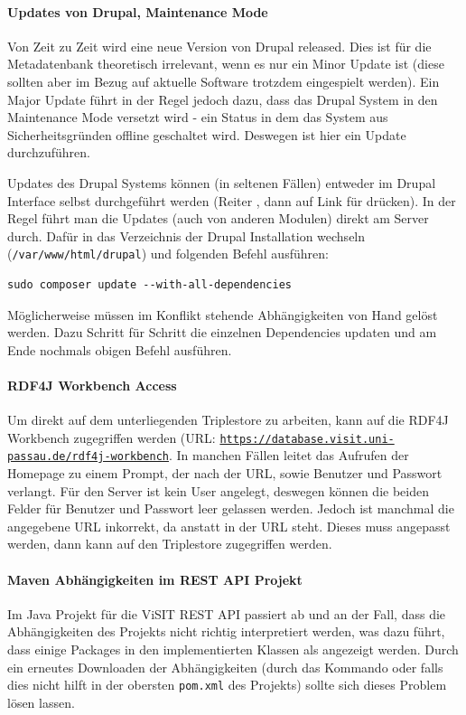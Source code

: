 \paragraph{Updates von Drupal, Maintenance Mode}

Von Zeit zu Zeit wird eine neue Version von Drupal released. Dies ist für die Metadatenbank theoretisch irrelevant, wenn es nur ein Minor Update ist (diese sollten aber im Bezug auf aktuelle Software trotzdem eingespielt werden). Ein Major Update führt in der Regel jedoch dazu, dass das Drupal System in den Maintenance Mode versetzt wird - ein Status in dem das System aus Sicherheitsgründen offline geschaltet wird. Deswegen ist hier ein Update durchzuführen.

Updates des Drupal Systems können (in seltenen Fällen) entweder im Drupal Interface selbst durchgeführt werden (Reiter , dann auf Link für  drücken). In der Regel führt man die Updates (auch von anderen Modulen) direkt am Server durch. Dafür in das Verzeichnis der Drupal Installation wechseln (\texttt{/var/www/html/drupal}) und folgenden Befehl ausführen:

\begin{lstlisting}[style=MyBashStyle, caption={Befehl zum Updaten einer Drupal Installation.}]
sudo composer update --with-all-dependencies 
\end{lstlisting}

Möglicherweise müssen im Konflikt stehende Abhängigkeiten von Hand gelöst werden. Dazu Schritt für Schritt die einzelnen Dependencies updaten und am Ende nochmals obigen Befehl ausführen.

\paragraph{RDF4J Workbench Access}

Um direkt auf dem unterliegenden Triplestore zu arbeiten, kann auf die RDF4J Workbench zugegriffen werden (URL: \texttt{\url{https://database.visit.uni-passau.de/rdf4j-workbench}}. In manchen Fällen leitet das Aufrufen der Homepage zu einem Prompt, der nach der URL, sowie Benutzer und Passwort verlangt. Für den Server ist kein User angelegt, deswegen können die beiden Felder für Benutzer und Passwort leer gelassen werden. Jedoch ist manchmal die angegebene URL inkorrekt, da \texttt{} anstatt \texttt{} in der URL steht. Dieses muss angepasst werden, dann kann auf den Triplestore zugegriffen werden.

\paragraph{Maven Abhängigkeiten im REST API Projekt}

Im Java Projekt für die ViSIT REST API passiert ab und an der Fall, dass die Abhängigkeiten des Projekts nicht richtig interpretiert werden, was dazu führt, dass einige Packages in den implementierten Klassen als  angezeigt werden. Durch ein erneutes Downloaden der Abhängigkeiten (durch das Kommando \texttt{} oder falls dies nicht hilft \texttt{} in der obersten \texttt{pom.xml} des Projekts) sollte sich dieses Problem lösen lassen.
